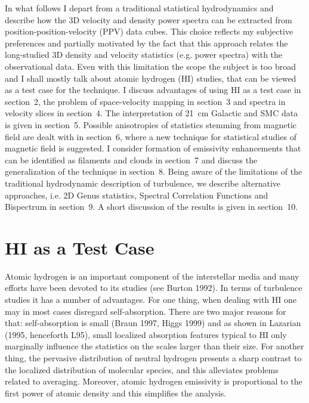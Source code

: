 In what follows I depart from a traditional statistical hydrodynamics and
describe how the 3D velocity and density power spectra can be extracted from
position-position-velocity (PPV) data cubes. This choice reflects my subjective
preferences and partially motivated by the fact that this approach relates the
long-studied 3D density and velocity statistics (e.g. power spectra)
with the observational data. Even with this limitation  the scope the subject
is too broad and I shall mostly talk about atomic hydrogen (HI) studies,
that can be viewed as a test case for the technique. I discuss advantages
of using HI as a test case in section~2, the problem of space-velocity
mapping in section~3 and spectra in velocity slices in section~4.
The interpretation of 21~cm Galactic and SMC
data is given in section~5. Possible anisotropies of statistics 
stemming from magnetic
field are dealt with in section~6, where a new technique for statistical 
studies of magnetic field is suggested. I consider formation of
emissivity enhancements that can be identified as 
 filaments and clouds in section~7 and 
discuss the generalization of the technique in section~8. Being aware of
the limitations of the traditional hydrodynamic description of turbulence,
we  describe alternative approaches, i.e.
 2D Genus statistics, Spectral Correlation Functions and
Bispectrum in section~9. A short discussion of the results is given
in section~10. 


\section{HI as a Test Case} 

Atomic hydrogen is an important component of the interstellar media 
and many
efforts have been devoted to its studies (see Burton 1992). 
In terms
of turbulence studies it has a number of advantages. For one thing, when
dealing with HI one may in most cases disregard self-absorption.
There are two major reasons for that: self-absorption
is small (Braun 1997, Higgs 1999) and as shown in Lazarian (1995, henceforth
L95), small localized absorption features typical to HI only
marginally influence the statistics on the scales larger than their size.
For another thing, the pervasive distribution of neutral hydrogen
presents a sharp contrast to the localized distribution of
molecular species, and this alleviates problems related to averaging.
Moreover, atomic hydrogen emissivity is proportional to the
first power of atomic density and this simplifies the analysis.

